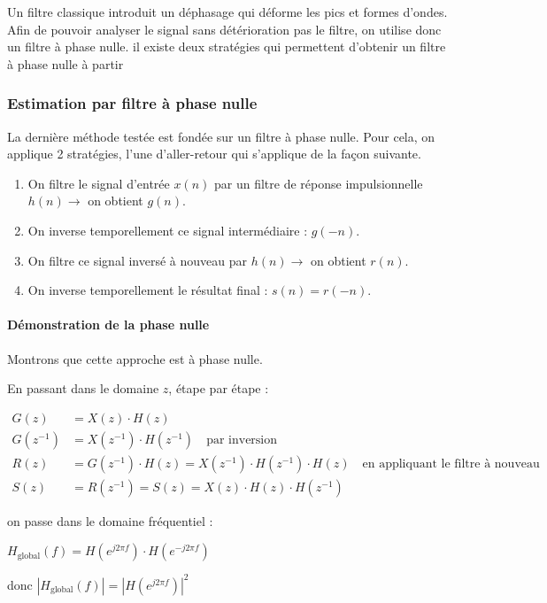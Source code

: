 \documentclass[a4paper,11pt]{article}
\begin{document}
Un filtre classique introduit un déphasage qui déforme les pics et formes d'ondes. Afin de pouvoir analyser le signal sans détérioration pas le filtre, on utilise donc un filtre à phase nulle.
il existe deux stratégies qui permettent d'obtenir un filtre à phase nulle à partir 

\subsubsection{Estimation par filtre à phase nulle}
La dernière méthode testée est fondée sur un filtre à phase nulle.
Pour cela, on applique 2 stratégies, l'une d'aller-retour qui s'applique de la façon suivante.

\begin{enumerate}
    \item On filtre le signal d'entrée $x(n)$ par un filtre de réponse impulsionnelle $h(n) \to$ on obtient $g(n)$.
    \item On inverse temporellement ce signal intermédiaire : $g(-n)$.
    \item On filtre ce signal inversé à nouveau par $h(n) \to$ on obtient $r(n)$.
    \item On inverse temporellement le résultat final : $s(n) = r(-n)$.
\end{enumerate}

\paragraph{Démonstration de la phase nulle}

Montrons que cette approche est à phase nulle.

En passant dans le domaine $z$, étape par étape :

\begin{align*}
G(z) &= X(z) \cdot H(z) \\
G(z^{-1}) &= X(z^{-1}) \cdot H(z^{-1}) \quad \text{par inversion} \\
R(z) &= G(z^{-1}) \cdot H(z) = X(z^{-1}) \cdot H(z^{-1}) \cdot H(z) \quad \text{en appliquant le filtre à nouveau} \\
S(z) &= R(z^{-1}) = S(z) = X(z) \cdot H(z) \cdot H(z^{-1})
\end{align*}

on passe dans le domaine fréquentiel :

$\boxed{H_{\text{global}}(f) = H(e^{j2\pi f}) \cdot H(e^{-j2\pi f})}$

donc $\boxed{|H_{\text{global}}(f)| = |H(e^{j2\pi f})|^2}$
\end{document}
